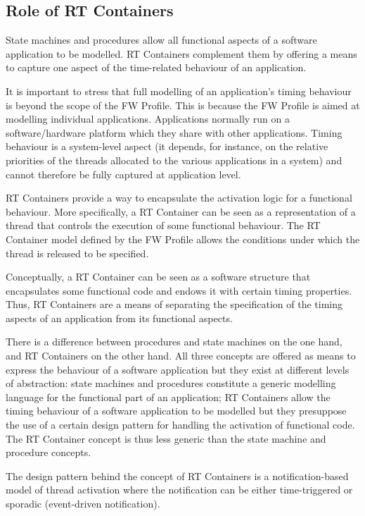 \documentclass[a4paper,10pt]{article}
\begin{document}
\subsection{Role of RT Containers}
State machines and procedures allow all functional aspects of a software application to be
modelled. RT Containers complement them by offering a means to capture one aspect of the
time-related behaviour of an application.

It is important to stress that full modelling of an application's timing behaviour is beyond the
scope of the FW Profile. This is because the FW Profile is aimed at modelling individual
applications. Applications normally run on a software/hardware platform which they share
with other applications. Timing behaviour is a system-level aspect (it depends, for instance, on
the relative priorities of the threads allocated to the various applications in a system) and
cannot therefore be fully captured at application level.

RT Containers provide a way to encapsulate the activation logic for a functional behaviour.
More specifically, a RT Container can be seen as a representation of a thread that controls the
execution of some functional behaviour. The RT Container model defined by the FW Profile
allows the conditions under which the thread is released to be specified.

Conceptually, a RT Container can be seen as a software structure that encapsulates some
functional code and endows it with certain timing properties. Thus, RT Containers are a means
of separating the specification of the timing aspects of an application from its functional
aspects.

There is a difference between procedures and state machines on the one hand, and RT Containers on the other hand. All three concepts are offered as means to express the behaviour
of a software application but they exist at different levels of abstraction: state machines and
procedures constitute a generic modelling language for the functional part of an application;
RT Containers allow the timing behaviour of a software application to be modelled but they
presuppose the use of a certain design pattern for handling the activation of functional code.
The RT Container concept is thus less generic than the state machine and procedure concepts.

The design pattern behind the concept of RT Containers is a notification-based model of thread
activation where the notification can be either time-triggered or sporadic (event-driven
notification).
\end{document}
